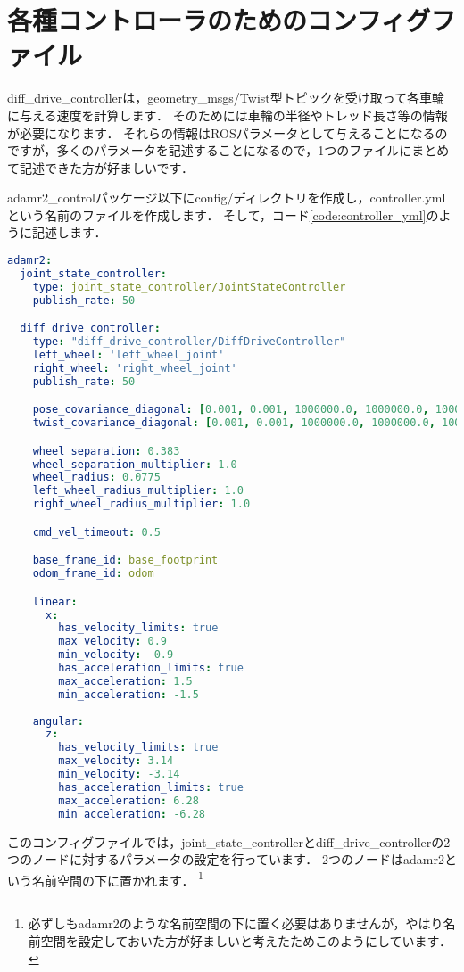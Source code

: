 \documentclass[{../../master}]{subfiles}
\begin{document}
\section{各種コントローラのためのコンフィグファイル}

\textsf{diff\_drive\_controller}は，\textsf{geometry\_msgs/Twist}型トピックを受け取って各車輪に与える速度を計算します．
そのためには車輪の半径やトレッド長さ等の情報が必要になります．
それらの情報はROSパラメータとして与えることになるのですが，多くのパラメータを記述することになるので，1つのファイルにまとめて記述できた方が好ましいです．

\textsf{adamr2\_control}パッケージ以下に\textsf{config/}ディレクトリを作成し，\textsf{controller.yml}という名前のファイルを作成します．
そして，コード\ref{code:controller_yml}のように記述します．

\begin{lstlisting}[language=YAML, label=code:controller_yml, caption=\textsf{controller.yml}]
adamr2:
  joint_state_controller:
    type: joint_state_controller/JointStateController
    publish_rate: 50

  diff_drive_controller:
    type: "diff_drive_controller/DiffDriveController"
    left_wheel: 'left_wheel_joint'
    right_wheel: 'right_wheel_joint'
    publish_rate: 50

    pose_covariance_diagonal: [0.001, 0.001, 1000000.0, 1000000.0, 1000000.0, 10.0]
    twist_covariance_diagonal: [0.001, 0.001, 1000000.0, 1000000.0, 1000000.0, 10.0]

    wheel_separation: 0.383
    wheel_separation_multiplier: 1.0
    wheel_radius: 0.0775
    left_wheel_radius_multiplier: 1.0
    right_wheel_radius_multiplier: 1.0

    cmd_vel_timeout: 0.5

    base_frame_id: base_footprint
    odom_frame_id: odom

    linear:
      x:
        has_velocity_limits: true
        max_velocity: 0.9
        min_velocity: -0.9
        has_acceleration_limits: true
        max_acceleration: 1.5
        min_acceleration: -1.5
      
    angular:
      z:
        has_velocity_limits: true
        max_velocity: 3.14
        min_velocity: -3.14
        has_acceleration_limits: true
        max_acceleration: 6.28
        min_acceleration: -6.28
\end{lstlisting}

このコンフィグファイルでは，\textsf{joint\_state\_controller}と\textsf{diff\_drive\_controller}の2つのノードに対するパラメータの設定を行っています．
2つのノードは\textsf{adamr2}という名前空間の下に置かれます．
\footnote{必ずしも\textsf{adamr2}のような名前空間の下に置く必要はありませんが，やはり名前空間を設定しておいた方が好ましいと考えたためこのようにしています．}
\end{document}
